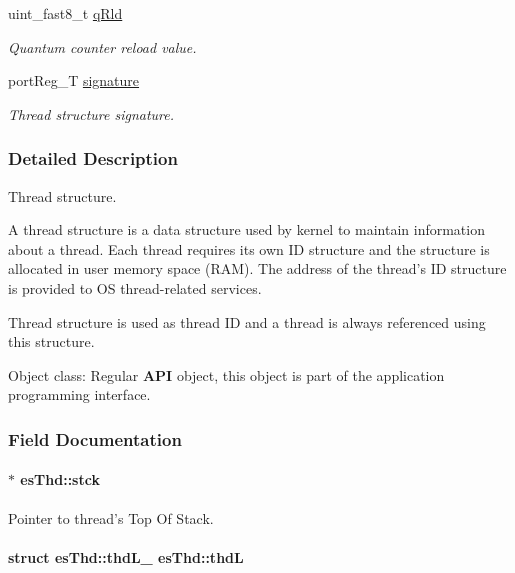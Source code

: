 \begin{DoxyCompactItemize}
uint\-\_\-fast8\-\_\-t \hyperlink{structesThd_a3c2c5e4b699e3c990e37000650f031ba}{q\-Rld}
\begin{DoxyCompactList}\small\item\em Quantum counter reload value. \end{DoxyCompactList}\item 
port\-Reg\-\_\-\-T \hyperlink{structesThd_a72e6c4660e827aae5a621894756a5eb2}{signature}
\begin{DoxyCompactList}\small\item\em Thread structure signature. \end{DoxyCompactList}\end{DoxyCompactItemize}


\subsubsection{Detailed Description}
Thread structure. 

A thread structure is a data structure used by kernel to maintain information about a thread. Each thread requires its own I\-D structure and the structure is allocated in user memory space (R\-A\-M). The address of the thread’s I\-D structure is provided to O\-S thread-\/related services.

Thread structure is used as thread I\-D and a thread is always referenced using this structure. \begin{DoxyParagraph}{Object class\-:}
Regular {\bfseries A\-P\-I} object, this object is part of the application programming interface. 
\end{DoxyParagraph}


\subsubsection{Field Documentation}
\hypertarget{structesThd_a5a7906c650bc81f3f0639f6f8565316b}{
\paragraph[{stck}]{$\ast$ es\-Thd\-::stck}}\label{structesThd_a5a7906c650bc81f3f0639f6f8565316b}


Pointer to thread's Top Of Stack. 

\hypertarget{structesThd_a69f72ac3b1f6199da48b41804f353325}{
\paragraph[{thd\-L}]{\setlength{\rightskip}{0pt plus 5cm}struct {\bf es\-Thd\-::thd\-L\-\_\-}                es\-Thd\-::thd\-L}}\label{structesThd_a69f72ac3b1f6199da48b41804f353325}



